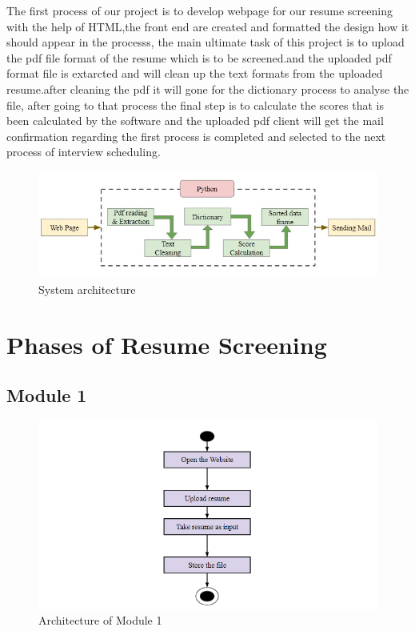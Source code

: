 \documentclass[12 pt, oneside]{book}
\begin{document}
The first process of our project is to develop webpage for our resume screening with the help of HTML,the front end are created and formatted the design how it should appear in the processs, the main ultimate task  of this project is to upload the pdf file format of the resume which is to be screened.and the uploaded pdf format file is extarcted and will clean up the text formats from the  uploaded resume.after cleaning the pdf it will gone for the dictionary process to analyse the file, after going to that process the final step is to calculate the scores that is been calculated by the software and the uploaded pdf client will get the mail confirmation regarding the first process is completed and selected to the next process of interview scheduling.

\begin{figure}[h]
	\begin{center}
		\includegraphics[width =15 cm]{arch.jpeg}
		\caption{System architecture}
		\label{ab}
	\end{center}
\end{figure}

\section{Phases of Resume Screening}
\subsection{Module 1}
\begin{figure}[h]
	\begin{center}
		\includegraphics[width = 13 cm]{m1.png}
		\caption{Architecture of Module 1}
		\label{ab}
	\end{center}
\end{figure}
\end{document}
